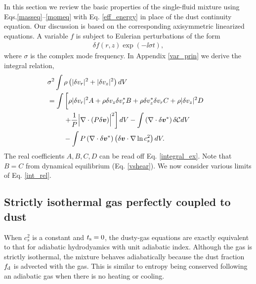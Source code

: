 In this section we review the basic properties of the 
single-fluid mixture using Eqs.\ref{masseq}--\ref{momeq} with 
Eq. \ref{eff_energy} in place of the dust continuity equation. Our
discussion is based on the corresponding axisymmetric linearized
equations. A variable $f$ is
subject to Eulerian perturbations of the form 
\begin{align}
  \delta f(r,z)\exp{\left(-\ii\sigma t\right)},
\end{align}
where $\sigma$ is the complex mode frequency. In Appendix
\ref{var_prin} we derive the integral relation,  
\begin{align}
&  \sigma^2\int\rho\left(|\dd v_r|^2 + |\dd v_z|^2\right)dV \notag\\
&= \int\left[ \rho
  |\dd v_r|^2A + \rho  \dd v_z \dd v_r^* B + \rho \dd v_z^*\dd v_r C +
  \rho |\dd v_z|^2 D\phantom{\frac{1}{1}}\right. \notag\\
&\phantom{===}  \left. + \frac{1}{P}\Bigl\lvert \nabla\cdot\left(P\dd
  \bm{v}\right)\Bigr\rvert^2\right]dV  -\int \left(\nabla\cdot\dd\bm{v}^*\right)\dd\mathcal{C}dV \notag\\
&\phantom{===}
- \int P
  \left(\nabla\cdot\dd\bm{v}^*\right)\left(\dd\bm{v}\cdot\nabla\ln{c_s^2}\right)dV.\label{int_rel}
\end{align} 
The real coefficients $A,B,C,D$ can be read off 
Eq. \ref{integral_ex}. Note that $B=C$ from dynamical equilibrium
(Eq. \ref{vshear}). We now consider various limits of
Eq. \ref{int_rel}.    


\subsection{Strictly isothermal gas perfectly coupled to dust}\label{iso_perfect}
When $c_s^2$ is a constant and $t_\mathrm{s}=0$, the dusty-gas equations are
exactly equivalent to that for adiabatic hydrodyamics with unit adiabatic
index. Although the gas is strictly isothermal, the mixture behaves 
adiabatically because the dust fraction $f_\mathrm{d}$ is advected with 
the gas. This is similar to entropy being conserved following an
adiabatic gas when there is no heating or cooling.  

